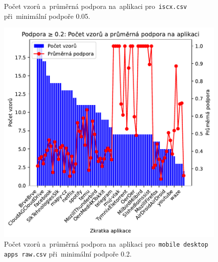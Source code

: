 \begin{figure}[H]
\begin{minipage}[t]{0.49\textwidth}
        \caption{Počet vzorů a~průměrná podpora na~aplikaci pro~\texttt{iscx.csv} při~minimální podpoře 0.05.}
        \label{fig:appendix-}
    \end{minipage}
\end{figure}

\begin{figure}[H]
    \centering
    \begin{minipage}[t]{0.49\textwidth}
        \centering
    \includegraphics[width=\linewidth]{obrazky-figures/exps/patterns_support_0.2_mobile.pdf}
    \caption{Počet vzorů a~průměrná podpora na~aplikaci pro~\texttt{mobile desktop apps raw.csv} při~minimální podpoře 0.2.}
    \label{fig:appendix-}
    \end{minipage}%
    \hfill
    \begin{minipage}[t]{0.49\textwidth}
       \centering

\end{minipage}
\end{figure}
